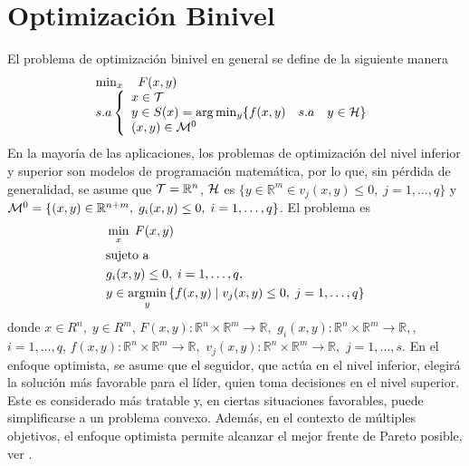 \section{Optimización Binivel }
El problema de optimización binivel en general se define de la siguiente manera \begin{equation} \label{eq:Def1Binivel}
    \begin{array}{l}
       \min_{x} \quad F(x, y)\\
        s.a \left\{ \begin{array}{l}
            x \in \cal{T} \\
             y \in S(x) = \arg  \min_{y} \{ f(x, y) \quad s.a \quad y \in  \cal{H}\}\\
            (x,y) \in {\cal{M}}^0 
        \end{array}\right.
        \end{array} \end{equation}
En la mayor\'ia de las aplicaciones, los problemas de optimización del nivel inferior y superior son modelos de programación matemática, por lo  que, sin pérdida de generalidad, se asume que  ${\cal{T}}=\mathbb{R}^n$,  $\cal{H}$ es  $\{y\in \mathbb{R}^m\in v_j(x, y)\leq 0,\;j=1,\ldots,q\}$  y
  ${\cal{M}}^0=\{(x,y)\in\mathbb{R}^{n+m},\;g_i(x, y)\leq 0,\;i=1,\ldots,q\}$. El problema es  
\begin{equation}
\begin{aligned}
& \min_{x} \; F(x, y) \\
& \text{sujeto a } \\
& g_i(x, y)\leq 0,\;i=1,\ldots,q, \\
& y \in \operatorname*{argmin}_{y} \left\{ f(x, y) \mid v_j(x, y)\leq 0,\;j=1,\ldots,q \right\}
\end{aligned}
\label{eq:ProblemaGeneral}
\end{equation}
donde 
$    x \in R^{n},\; y \in R^{m}$, $ F(x,y) : \mathbb{R}^{n} \times \mathbb{R}^{m} \to \mathbb{R},$ $ g_i(x,y)  : \mathbb{R}^{n} \times \mathbb{R}^{m} \to \mathbb{R} ,$, $i=1,\ldots, q$,  $f(x,y) : \mathbb{R}^{n} \times \mathbb{R}^{m} \to \mathbb{R},$  $v_j(x,y)  : \mathbb{R}^{n} \times \mathbb{R}^{m} \to \mathbb{R} ,$ $j=1,\ldots, s$.
En el enfoque optimista, se asume que el seguidor, que actúa en el nivel inferior, elegirá la solución más favorable para el líder, quien toma decisiones en el nivel superior. Este es considerado más tratable y, en ciertas situaciones favorables, puede simplificarse a un problema convexo. Además, en el contexto de múltiples objetivos, el enfoque optimista permite alcanzar el mejor frente de Pareto posible, ver \cite{DempeyZemkoho2020}.

